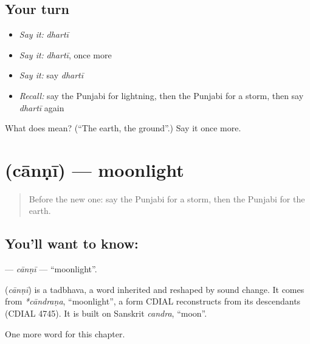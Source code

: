 \subsection*{Your turn}
\begin{itemize}
\raggedright
  \item \emph{Say it:} \emph{dhartī}
  \item \emph{Say it:} \emph{dhartī}, once more
  \item \emph{Say it:} say \emph{dhartī}
  \item \emph{Recall:} say the Punjabi for lightning, then the Punjabi for a storm, then say \emph{dhartī} again
\end{itemize}

\begin{tcolorbox}[breakable,colback=teal!4,colframe=teal!35!black,title={Before you move on}]
What does  mean? (\textquotedblleft{}The earth, the ground\textquotedblright{}.) Say it once more.
\end{tcolorbox}
\section[\texorpdfstring{\pa{ਚਾਨਣੀ} (cānṇī)}{ਚਾਨਣੀ (cānṇī)}]{ (cānṇī) — moonlight}

\label{lesson:PA-C128-canni}



\begin{quote}
Before the new one: say the Punjabi for a storm, then the Punjabi for the earth.
\end{quote}

\subsection*{You'll want to know: }
\textbf{} — \emph{cānṇī} — \textquotedblleft{}moonlight\textquotedblright{}.

\begin{cousinweb}
\textbf{} (\emph{cānṇī}) is a tadbhava, a word inherited and reshaped by sound change. It comes from \emph{*cāndraṇa}, \textquotedblleft{}moonlight\textquotedblright{}, a form CDIAL reconstructs from its descendants (CDIAL 4745). It is built on Sanskrit \emph{candra}, \textquotedblleft{}moon\textquotedblright{}.
\end{cousinweb}

\begin{grammarlens}[title={What you've built}]
One more word for this chapter.
\end{grammarlens}

